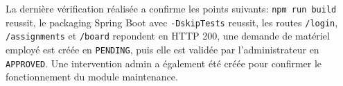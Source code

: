 La dernière vérification réalisée a confirme les points suivants: \texttt{npm run build} reussit, le packaging Spring Boot avec \texttt{-DskipTests} reussit, les routes \texttt{/login}, \texttt{/assignments} et \texttt{/board} repondent en HTTP 200, une demande de matériel employé est créée en \texttt{PENDING}, puis elle est validée par l'administrateur en \texttt{APPROVED}. Une intervention admin a également été créée pour confirmer le fonctionnement du module maintenance.









